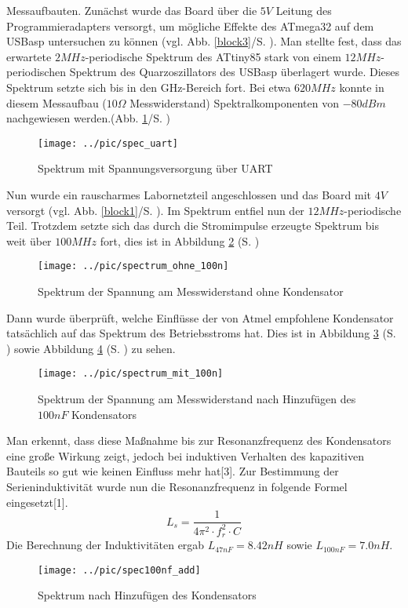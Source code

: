 \documentclass[a4paper,10pt, twocolumn]{article}
\begin{document}
\begin{section}
Messaufbauten.
Zunächst wurde das Board über die $5V$ Leitung des Programmieradapters 
versorgt, 
um mögliche Effekte des ATmega32 auf dem USBasp untersuchen zu können (vgl. 
Abb. \ref{block3}/S. \pageref{block3}). Man 
stellte fest, dass das erwartete $2MHz$-periodische Spektrum des ATtiny85 
stark von einem $12MHz$-periodischen Spektrum des Quarzoszillators des USBasp 
überlagert wurde. Dieses Spektrum setzte sich bis in den GHz-Bereich fort. Bei 
etwa $620MHz$ konnte in diesem Messaufbau ($10\Omega$ Messwiderstand) 
Spektralkomponenten von $-80dBm$ nachgewiesen werden.(Abb. \ref{uart}/S. 
\pageref{uart})
\begin{figure}[H]
  \texttt{[image: ../pic/spec\_uart]}
  \caption{Spektrum mit Spannungsversorgung über UART}
  \label{uart}
\end{figure}
Nun wurde ein rauscharmes Labornetzteil angeschlossen und das Board mit $4V$ 
versorgt (vgl. 
Abb. \ref{block1}/S. \pageref{block1}). Im Spektrum entfiel nun der 
$12MHz$-periodische Teil. Trotzdem setzte 
sich das durch die Stromimpulse erzeugte Spektrum bis weit über $100MHz$ fort, 
dies ist in Abbildung \ref{spec200mhzO100n} (S. \pageref{spec200mhzO100n})
\begin{figure}[H]
  \texttt{[image: ../pic/spectrum\_ohne\_100n]}
  \caption{Spektrum der Spannung am Messwiderstand ohne Kondensator}
  \label{spec200mhzO100n}
\end{figure}
Dann wurde überprüft, welche Einflüsse der von Atmel empfohlene Kondensator 
tatsächlich auf das Spektrum des Betriebsstroms hat. Dies ist in Abbildung 
\ref{spec200mhzM100n} (S. \pageref{spec200mhzO100n}) sowie 
Abbildung \ref{100nfadd} (S. \pageref{100nfadd})  
zu sehen. 
\begin{figure}[H]
  \texttt{[image: ../pic/spectrum\_mit\_100n]}
  \caption{Spektrum der Spannung am Messwiderstand nach Hinzufügen des 
$100nF$ Kondensators}
  \label{spec200mhzM100n}
\end{figure}
Man erkennt, dass diese Maßnahme bis zur Resonanzfrequenz des 
Kondensators eine große Wirkung zeigt, jedoch bei induktiven Verhalten des 
kapazitiven Bauteils so gut wie keinen Einfluss mehr hat[3].\newline
Zur Bestimmung der Serieninduktivität wurde nun die Resonanzfrequenz in 
folgende Formel eingesetzt[1].
\[L_s=\frac{1}{4\pi{}^2\cdot{}f^{2}_r\cdot{}C}\]
Die Berechnung der Induktivitäten ergab $L_{47nF}=8.42nH$ sowie 
$L_{100nF}=7.0nH$.
\begin{figure}
  \texttt{[image: ../pic/spec100nf\_add]}
  \caption{Spektrum nach Hinzufügen des Kondensators}
  \label{100nfadd}
\end{figure}
\end{section}
\end{document}
